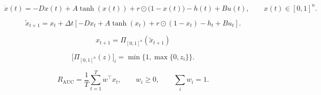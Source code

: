 
\[
\dot{x}(t)
=
-Dx(t)
+A\tanh(x(t))
+r\odot\bigl(1-x(t)\bigr)
-h(t)
+Bu(t),
\qquad
x(t)\in[0,1]^n.
\]

\[
\tilde{x}_{t+1}
=
x_t+\Delta t\left[
-Dx_t
+A\tanh(x_t)
+r\odot(1-x_t)
-h_t
+Bu_t
\right].
\]

\[
\boxed{
 x_{t+1}=\Pi_{[0,1]^n}\!\left(\tilde{x}_{t+1}\right)
}
\]

\[
\bigl[\Pi_{[0,1]^n}(z)\bigr]_i
=
\min\{1,\max\{0,z_i\}\}.
\]

\[
R_{\mathrm{AUC}}
=
\frac{1}{T}\sum_{t=1}^{T} w^{\top}x_t,
\qquad
w_i\ge0,
\qquad
\sum_i w_i=1.
\]
